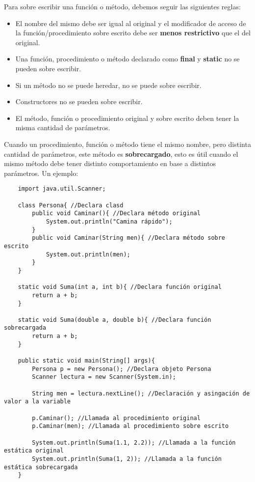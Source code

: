 Para sobre escribir una función o método, debemos seguir las siguientes reglas:
\begin{itemize}
    \item El nombre del mismo debe ser igual al original y el modificador de acceso de la función/procedimiento sobre escrito debe ser \textbf{menos restrictivo} que el del original.
    \item Una función, procedimiento o método declarado como \textbf{final} y \textbf{static} no se pueden sobre escribir.
    \item Si un método no se puede heredar, no se puede sobre escribir.
    \item Constructores no se pueden sobre escribir.
    \item El método, función o procedimiento original y sobre escrito deben tener la misma cantidad de parámetros.
\end{itemize}

Cuando un procedimiento, función o método tiene el mismo nombre, pero distinta cantidad de parámetros, este método es \textbf{sobrecargado}, esto es útil cuando el mismo método debe tener distinto comportamiento en base a distintos parámetros. Un ejemplo:
\begin{lstlisting}
    import java.util.Scanner;
    
    class Persona{ //Declara clasd
        public void Caminar(){ //Declara método original
            System.out.println("Camina rápido");
        }
        public void Caminar(String men){ //Declara método sobre escrito
            System.out.println(men);
        }
    }
    
    static void Suma(int a, int b){ //Declara función original
        return a + b;
    }
    
    static void Suma(double a, double b){ //Declara función sobrecargada
        return a + b;
    }
    
    public static void main(String[] args){
        Persona p = new Persona(); //Declara objeto Persona
        Scanner lectura = new Scanner(System.in);
        
        String men = lectura.nextLine(); //Declaración y asingación de valor a la variable
        
        p.Caminar(); //Llamada al procedimiento original
        p.Caminar(men); //Llamada al procedimiento sobre escrito
        
        System.out.println(Suma(1.1, 2.2)); //Llamada a la función estática original
        System.out.println(Suma(1, 2)); //Llamada a la función estática sobrecargada
    }
\end{lstlisting}


